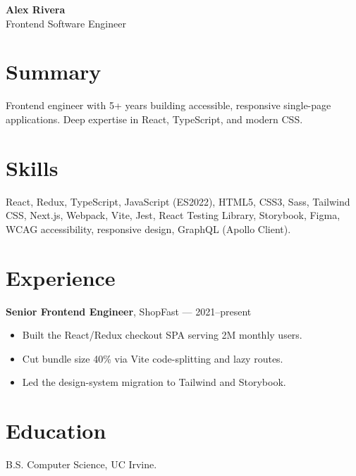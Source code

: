 \documentclass[letterpaper,11pt]{article}
\begin{document}
\textbf{Alex Rivera} \\
Frontend Software Engineer

\section*{Summary}
Frontend engineer with 5+ years building accessible, responsive single-page
applications. Deep expertise in React, TypeScript, and modern CSS.

\section*{Skills}
React, Redux, TypeScript, JavaScript (ES2022), HTML5, CSS3, Sass, Tailwind CSS,
Next.js, Webpack, Vite, Jest, React Testing Library, Storybook, Figma, WCAG
accessibility, responsive design, GraphQL (Apollo Client).

\section*{Experience}
\textbf{Senior Frontend Engineer}, ShopFast --- 2021--present
\begin{itemize}
  \item Built the React/Redux checkout SPA serving 2M monthly users.
  \item Cut bundle size 40\% via Vite code-splitting and lazy routes.
  \item Led the design-system migration to Tailwind and Storybook.
\end{itemize}

\section*{Education}
B.S. Computer Science, UC Irvine.
\end{document}
